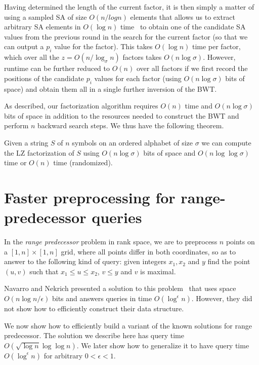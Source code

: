 \documentclass[11pt,runningheads]{llncs}
\begin{document}
Having determined the length of the current factor, it is then simply a matter 
of using a sampled SA of size $O(n/log n)$ elements that allows us to extract 
arbitrary SA elements in $O(\log n)$ time~\cite{fm2005} to obtain one of the candidate SA 
values from the previous round 
in the search for the current factor (so that we can output a $p_i$ value for the factor). 
This takes $O(\log n)$ time per factor, which over all the $z = O(n/\log_{\sigma} n)$
factors takes $O(n\log \sigma)$. However, runtime can be further reduced to $O(n)$ over all 
factors if we first record the positions of the candidate $p_i$ values for each factor 
(using $O(n\log \sigma)$ bits of space) and obtain them all in a single further inversion 
of the BWT.

As described, our factorization algorithm requires $O(n)$ time and $O(n\log \sigma)$ bits 
of space in addition to the resources needed to construct the BWT and perform $n$ 
backward search steps. We thus have the following theorem.

\begin{theorem}
\label{lz-compact-space}
Given a string $S$ of $n$ symbols on an ordered alphabet of size $\sigma$ we can compute 
the LZ factorization of $S$ using $O(n\log \sigma)$ bits of space and $O(n\log\log \sigma)$ 
time or $O(n)$ time (randomized).
\end{theorem}

\section{Faster preprocessing for range-predecessor queries}
\label{sec-rangepred}

In the {\em range predecessor} problem in rank space, we are to preprocess 
$n$ points on a $[1,n]\times [1,n]$ grid, where all points  
differ in both coordinates, so as to answer to the following 
kind of query: given integers $x_1,x_2$ and $y$ find the point $(u,v)$
such that $x_1\leq u\leq x_2$, $v\leq y$ and $v$ is maximal. 


Navarro and Nekrich presented a solution to this problem~\cite{nn2012} 
that uses space $O(n\log n/\epsilon)$ bits and  
answers queries in time $O(\log^\epsilon n)$.
However, they did not show how to efficiently construct their data structure. 




We now show how 
to efficiently build a variant of the known solutions 
for range predecessor. The solution we describe here has query 
time $O(\sqrt{\log n}\log\log n)$. We later show how to generalize it 
to have query time $O(\log^\epsilon n)$ for arbitrary $0<\epsilon<1$. 
\end{document}
